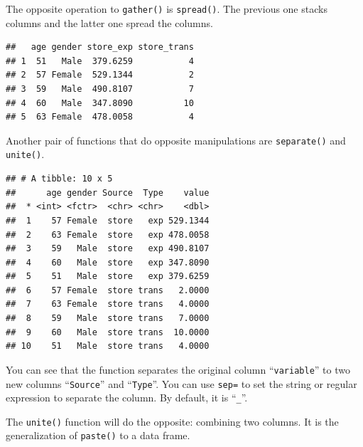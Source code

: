 \documentclass[]{book}
\newenvironment{Shaded}{\begin{snugshade}}{\end{snugshade}}
\newcommand{\KeywordTok}[1]{\textcolor[rgb]{0.13,0.29,0.53}{\textbf{{#1}}}}
\newcommand{\StringTok}[1]{\textcolor[rgb]{0.31,0.60,0.02}{{#1}}}
\newcommand{\NormalTok}[1]{{#1}}
\theoremstyle{definition}
\theoremstyle{definition}
\theoremstyle{remark}
\begin{document}
The opposite operation to \texttt{gather()} is \texttt{spread()}. The
previous one stacks columns and the latter one spread the columns.

\begin{Shaded}
\end{Shaded}

\begin{verbatim}
##   age gender store_exp store_trans
## 1  51   Male  379.6259           4
## 2  57 Female  529.1344           2
## 3  59   Male  490.8107           7
## 4  60   Male  347.8090          10
## 5  63 Female  478.0058           4
\end{verbatim}

Another pair of functions that do opposite manipulations are
\texttt{separate()} and \texttt{unite()}.

\begin{Shaded}
\end{Shaded}

\begin{verbatim}
## # A tibble: 10 x 5
##      age gender Source  Type    value
##  * <int> <fctr>  <chr> <chr>    <dbl>
##  1    57 Female  store   exp 529.1344
##  2    63 Female  store   exp 478.0058
##  3    59   Male  store   exp 490.8107
##  4    60   Male  store   exp 347.8090
##  5    51   Male  store   exp 379.6259
##  6    57 Female  store trans   2.0000
##  7    63 Female  store trans   4.0000
##  8    59   Male  store trans   7.0000
##  9    60   Male  store trans  10.0000
## 10    51   Male  store trans   4.0000
\end{verbatim}

You can see that the function separates the original column
``\texttt{variable}'' to two new columns ``\texttt{Source}'' and
``\texttt{Type}''. You can use \texttt{sep=} to set the string or
regular expression to separate the column. By default, it is
``\texttt{\_}''.

The \texttt{unite()} function will do the opposite: combining two
columns. It is the generalization of \texttt{paste()} to a data frame.
\end{document}
